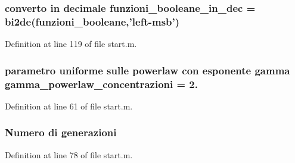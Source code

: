 \hypertarget{a00113_af44cf9f59bd0c10b4d2aa541bd7c156b}{
\subsubsection[{funzioni\-\_\-booleane\-\_\-in\-\_\-dec}]{\setlength{\rightskip}{0pt plus 5cm}converto in decimale funzioni\-\_\-booleane\-\_\-in\-\_\-dec = bi2de(funzioni\-\_\-booleane,'left-\/msb')}}\label{a00113_af44cf9f59bd0c10b4d2aa541bd7c156b}


Definition at line 119 of file start.\-m.

\hypertarget{a00113_a7cd0915d7542523abc226a8eecf67ecf}{
\subsubsection[{gamma\-\_\-powerlaw\-\_\-concentrazioni}]{\setlength{\rightskip}{0pt plus 5cm}parametro uniforme sulle powerlaw con esponente gamma gamma\-\_\-powerlaw\-\_\-concentrazioni = 2.}}\label{a00113_a7cd0915d7542523abc226a8eecf67ecf}


Definition at line 61 of file start.\-m.

\hypertarget{a00113_a5951b3462407a0e7e2e60534f76f5fec}{
\subsubsection[{generazioni}]{\setlength{\rightskip}{0pt plus 5cm}Numero di generazioni}}\label{a00113_a5951b3462407a0e7e2e60534f76f5fec}


Definition at line 78 of file start.\-m.

